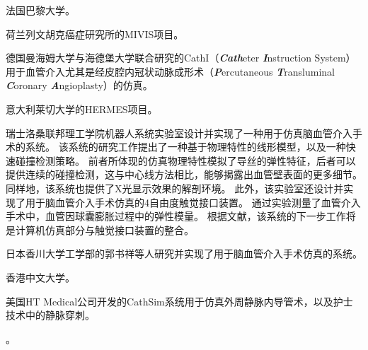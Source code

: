 法国巴黎大学\cite{Ghembaza2004ParisU}。

荷兰列文胡克癌症研究所的MIVIS项目\cite{Konings2003NKI}\cite{alderliesten2002NKI}\cite{alderliesten2004NKI}\cite{alderliesten2007NKI}\cite{alderliesten2007aNKI}\cite{Bosman2005NKI}。

德国曼海姆大学与海德堡大学联合研究的CathI（\textbf{\textit{Cath}}eter \textbf{\textit{I}}nstruction System）用于血管介入尤其是经皮腔内冠状动脉成形术（\textbf{\textit{P}}ercutaneous \textbf{\textit{T}}ransluminal \textbf{\textit{C}}oronary \textbf{\textit{A}}ngioplasty）的仿真\cite{rebholz2004cathi}\cite{Hoefer2002CathI}。

意大利莱切大学的HERMES项目\cite{aloisio2006HERMES}\cite{aloisio2004HERMES}\cite{aloisio2006aHERMES}\cite{aloisio2005HERMES}。

瑞士洛桑联邦理工学院机器人系统实验室设计并实现了一种用于仿真脑血管介入手术的系统\cite{Wang2007EPFL}\cite{Ilic2005EPFL}\cite{Moix2005EPFL}\cite{Ilic2005aEPFL}\cite{Ilic2005bEPFL}。
该系统的研究工作提出了一种基于物理特性的线形模型，以及一种快速碰撞检测策略\cite{Wang2007EPFL}。
前者所体现的仿真物理特性模拟了导丝的弹性特征，后者可以提供连续的碰撞检测，这与中心线方法相比，能够揭露出血管壁表面的更多细节。
同样地，该系统也提供了X光显示效果的解剖环境。
此外，该实验室还设计并实现了用于脑血管介入手术仿真的4自由度触觉接口装置\cite{Ilic2005EPFL}\cite{Moix2005EPFL}\cite{Ilic2005aEPFL}。
通过实验测量了血管介入手术中，血管因球囊膨胀过程中的弹性模量\cite{Ilic2005bEPFL}。
根据文献\cite{Wang2007EPFL}，该系统的下一步工作将是计算机仿真部分与触觉接口装置的整合。

日本香川大学工学部的郭书祥等人研究并实现了用于脑血管介入手术仿真的系统\cite{Gao2012GUO}\cite{Gao2012aGUO}\cite{Gao2012bGUO}。

香港中文大学\cite{cuhkweb}\cite{guo2007CUHK}\cite{Chui2010CUHK}。

美国HT Medical公司开发的CathSim系统用于仿真外周静脉内导管术\cite{ursino1999cathsim}，以及护士技术中的静脉穿刺\cite{Barker1999CathSim}。

\cite{Hahn1998Vena}。

